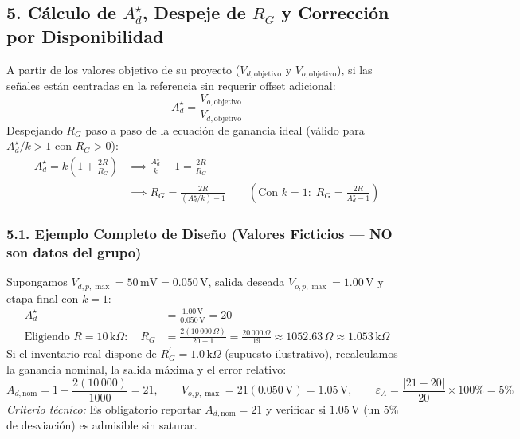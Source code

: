 \documentclass[10pt, a4paper]{article}
\begin{document}
\subsection*{5. Cálculo de $A_d^\star$, Despeje de $R_G$ y Corrección por Disponibilidad}
A partir de los valores objetivo de su proyecto ($V_{d,\text{objetivo}}$ y $V_{o,\text{objetivo}}$), si las señales están centradas en la referencia sin requerir offset adicional:
\begin{equation}
    \boxed{A_d^\star = \frac{V_{o,\text{objetivo}}}{V_{d,\text{objetivo}}}}
\end{equation}
Despejando $R_G$ paso a paso de la ecuación de ganancia ideal (válido para $A_d^\star / k > 1$ con $R_G > 0$):
\begin{align}
    A_d^\star = k\left(1 + \frac{2R}{R_G}\right) &\implies \frac{A_d^\star}{k} - 1 = \frac{2R}{R_G} \nonumber \\
    &\implies \boxed{R_G = \frac{2R}{(A_d^\star / k) - 1}} \qquad \left(\text{Con } k=1:\; \boxed{R_G = \frac{2R}{A_d^\star - 1}}\right)
\end{align}

\subsubsection*{5.1. Ejemplo Completo de Diseño (Valores Ficticios — NO son datos del grupo)}
Supongamos $V_{d,p,\max} = 50\,\text{mV} = 0.050\,\text{V}$, salida deseada $V_{o,p,\max} = 1.00\,\text{V}$ y etapa final con $k=1$:
\begin{align}
    A_d^\star &= \frac{1.00\,\text{V}}{0.050\,\text{V}} = 20 \\
    \text{Eligiendo } R = 10\,\text{k}\Omega:\quad R_G &= \frac{2(10\,000\,\Omega)}{20 - 1} = \frac{20\,000\,\Omega}{19} \approx 1052.63\,\Omega \approx 1.053\,\text{k}\Omega
\end{align}
Si el inventario real dispone de $R_G^\prime = 1.0\,\text{k}\Omega$ (supuesto ilustrativo), recalculamos la ganancia nominal, la salida máxima y el error relativo:
\begin{equation}
    A_{d,\mathrm{nom}} = 1 + \frac{2(10\,000)}{1000} = 21, \qquad V_{o,p,\max} = 21(0.050\,\text{V}) = 1.05\,\text{V}, \qquad \varepsilon_A = \frac{|21 - 20|}{20}\times 100\% = 5\%
\end{equation}
\textit{Criterio técnico:} Es obligatorio reportar $A_{d,\mathrm{nom}} = 21$ y verificar si $1.05\,\text{V}$ (un $5\%$ de desviación) es admisible sin saturar.
\end{document}
